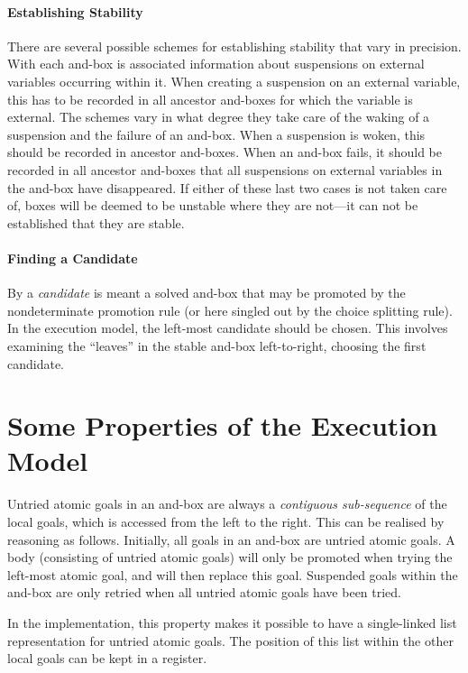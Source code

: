 \paragraph{Establishing Stability}
There are several possible schemes for establishing stability that
vary in precision.  With each and-box is associated information about
suspensions on external variables occurring within it.  When creating
a suspension on an external variable, this has to be recorded in all
ancestor and-boxes for which the variable is external.  The schemes
vary in what degree they take care of the waking of a suspension and
the failure of an and-box.  When a suspension is woken, this should be
recorded in ancestor and-boxes.  When an and-box fails, it should be
recorded in all ancestor and-boxes that all suspensions on external
variables in the and-box have disappeared.  If either of these last
two cases is not taken care of, boxes will be deemed to be unstable
where they are not---it can not be established that they are stable.

\paragraph{Finding a Candidate}
By a {\em candidate} is meant a solved and-box that may be promoted by
the nondeterminate promotion rule (or here singled out by the choice
splitting rule).  In the execution model, the left-most candidate
should be chosen.  This involves examining the ``leaves'' in the
stable and-box left-to-right, choosing the first candidate.

\section{Some Properties of the Execution Model}

Untried atomic goals in an and-box are always a {\em contiguous
sub-sequence} of the local goals, which is accessed from the left to
the right.  This can be realised by reasoning as follows.  Initially,
all goals in an and-box are untried atomic goals.  A body (consisting
of untried atomic goals) will only be promoted when trying the
left-most atomic goal, and will then replace this goal.  Suspended
goals within the and-box are only retried when all untried atomic
goals have been tried.

In the implementation, this property makes it possible to have a
single-linked list representation for untried atomic goals.  The
position of this list within the other local goals can be kept in a
register.

